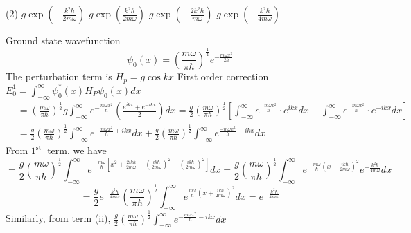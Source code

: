 \begin{enumerate}
\begin{minipage}{\textwidth}
\end{minipage}
\begin{tasks}(2)
	\task[\textbf{A.}] $g \exp \left(-\frac{k^{2} \hbar}{2 m \omega}\right)$
	\task[\textbf{B.}]$g \exp \left(\frac{k^{2} \hbar}{2 m \omega}\right)$
	\task[\textbf{C.}]$g \exp \left(-\frac{2 k^{2} \hbar}{m \omega}\right)$
	\task[\textbf{D.}] $g \exp \left(-\frac{k^{2} \hbar}{4 m \omega}\right)$
\end{tasks}
\begin{answer}
	Ground state wavefunction
	$$
	\psi_{0}(x)=\left(\frac{m \omega}{\pi \hbar}\right)^{\frac{1}{4}} e^{-\frac{m \omega x^{2}}{2 \hbar}}
	$$
	The perturbation term is $H_{p}=g \cos k x$
	First order correction $E_{0}^{1}=\int_{-\infty}^{\infty} \psi_{0}^{*}(x) H_{P} \psi_{0}(x) d x$\\
	$$\begin{aligned}
	&=\left(\frac{m \omega}{\pi \hbar}\right)^{\frac{1}{2}} g \int_{-\infty}^{\infty} e^{-\frac{m \omega x^{2}}{\hbar}}\left(\frac{e^{i k x}+e^{-i k x}}{2}\right) d x=\frac{g}{2}\left(\frac{m \omega}{\pi \hbar}\right)^{\frac{1}{2}}\left[\int_{-\infty}^{\infty} e^{\frac{-m \omega x^{2}}{\hbar}} \cdot e^{i k x} d x+\int_{-\infty}^{\infty} e^{\frac{-m \omega x^{2}}{\hbar}} \cdot e^{-i k x} d x\right] \\
	&=\frac{g}{2}\left(\frac{m \omega}{\pi \hbar}\right)^{\frac{1}{2}} \int_{-\infty}^{\infty} e^{-\frac{m \omega x^{2}}{\hbar}+i k x} d x+\frac{g}{2}\left(\frac{m \omega}{\pi \hbar}\right)^{\frac{1}{2}} \int_{-\infty}^{\infty} e^{\frac{-m \omega x^{2}}{\hbar}-i k x} d x
	\end{aligned}$$
	From $1^{\text {st }}$ term, we have
	$$
	=\frac{g}{2}\left(\frac{m \omega}{\pi \hbar}\right)^{\frac{1}{2}} \int_{-\infty}^{\infty} e^{-\frac{m \omega}{\hbar}\left[x^{2}+\frac{2 i k \hbar}{2 m \omega}+\left(\frac{i k \hbar}{2 m \omega}\right)^{2}-\left(\frac{i k \hbar}{2 m \omega}\right)^{2}\right]} d x=\frac{g}{2}\left(\frac{m \omega}{\pi \hbar}\right)^{\frac{1}{2}} \int_{-\infty}^{\infty} e^{-\frac{m \omega}{\hbar}\left(x+\frac{i k \hbar}{2 m \omega}\right)^{2}} e^{-\frac{k^{2} \hbar}{4 m \omega}} d x
	$$
	$$
	=\frac{g}{2} e^{-\frac{k^{2} \hbar}{4 m \omega}}\left(\frac{m \omega}{\pi \hbar}\right)^{\frac{1}{2}} \int_{-\infty}^{\infty} e^{\frac{m \omega}{\hbar}\left(x+\frac{i k \hbar}{2 m \omega}\right)^{2}} d x=e^{-\frac{k^{2} \hbar}{4 m \omega}}
	$$
	Similarly, from term (ii), $\frac{g}{2}\left(\frac{m \omega}{\pi \hbar}\right)^{\frac{1}{2}} \int_{-\infty}^{\infty} e^{-\frac{m \omega x^{2}}{\hbar}-i k x} d x$

\end{answer}
\end{enumerate}
